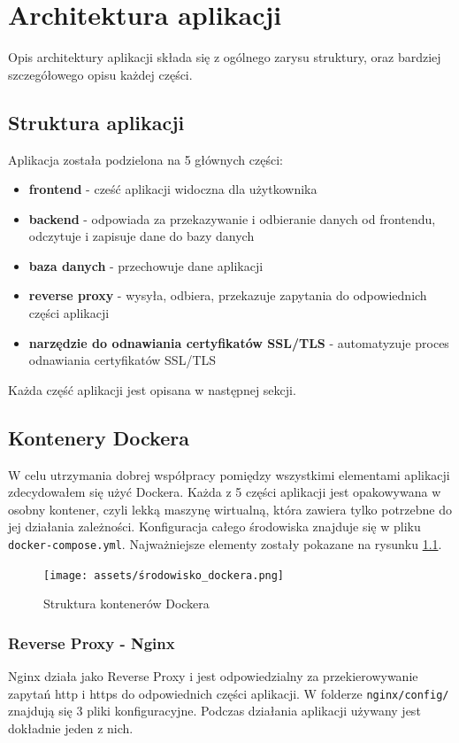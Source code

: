\documentclass[shortabstract]{iithesis}
\begin{document}
\chapter{Architektura aplikacji}
Opis architektury aplikacji składa się z ogólnego zarysu struktury, oraz bardziej szczegółowego opisu każdej części.
\section{Struktura aplikacji}
Aplikacja została podzielona na 5 głównych części:
\begin{itemize}
    \item \textbf{frontend} - cześć aplikacji widoczna dla użytkownika
    \item \textbf{backend} - odpowiada za przekazywanie i odbieranie danych od frontendu, odczytuje i zapisuje dane do bazy danych
    \item \textbf{baza danych} - przechowuje dane aplikacji
    \item \textbf{reverse proxy} - wysyła, odbiera, przekazuje zapytania do odpowiednich części aplikacji
    \item \textbf{narzędzie do odnawiania certyfikatów SSL/TLS} - automatyzuje proces odnawiania certyfikatów SSL/TLS
\end{itemize}
Każda część aplikacji jest opisana w następnej sekcji.

\section{Kontenery Dockera}
W celu utrzymania dobrej współpracy pomiędzy wszystkimi elementami aplikacji zdecydowałem się użyć Dockera\cite{Docker}.
Każda z 5 części aplikacji jest opakowywana w osobny kontener, czyli lekką maszynę wirtualną, która zawiera tylko potrzebne do jej działania zależności.
Konfiguracja całego środowiska znajduje się w pliku \texttt{docker-compose.yml}. Najważniejsze elementy zostały pokazane na rysunku \ref{fig:docker_containers_environment}.

\begin{figure}[H]
    \centering
    \texttt{[image: assets/środowisko\_dockera.png]}
    \caption{Struktura kontenerów Dockera}
    \label{fig:docker_containers_environment}
\end{figure}

\subsection{Reverse Proxy - Nginx}
Nginx\cite{Nginx} działa jako Reverse Proxy i jest odpowiedzialny za przekierowywanie zapytań http i https do odpowiednich części aplikacji.
W folderze \texttt{nginx/config/} znajdują się 3 pliki konfiguracyjne. Podczas działania aplikacji używany jest dokładnie jeden z nich.
\end{document}
